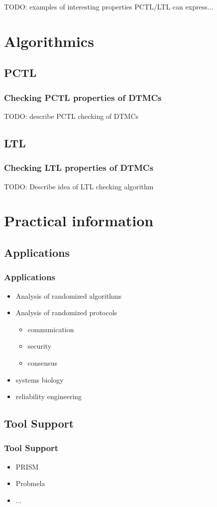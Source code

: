 \documentclass[handout]{beamer}
\begin{document}
\begin{frame}
TODO: examples of interesting properties PCTL/LTL can express...
\end{frame}

\section{Algorithmics}
\subsection{PCTL}
\begin{frame}
\frametitle{Checking PCTL properties of DTMCs}

TODO: describe PCTL checking of DTMCs
\end{frame}

\subsection{LTL}
\begin{frame}
\frametitle{Checking LTL properties of DTMCs}

TODO: Describe idea of LTL checking algorithm
\end{frame}

\section{Practical information}
\subsection{Applications}
\begin{frame}
\frametitle{Applications}
\begin{itemize}
\item Analysis of randomized algorithms
\item Analysis of randomized protocols
\begin{itemize}
\item communication
\item security
\item consensus
\end{itemize}
\item systems biology
\item reliability engineering
\end{itemize}
\end{frame}

\subsection{Tool Support}
\begin{frame}
\frametitle{Tool Support}
\begin{itemize}
\item PRISM
\item Probmela
\item ...
\end{itemize}
\end{frame}
\end{document}

